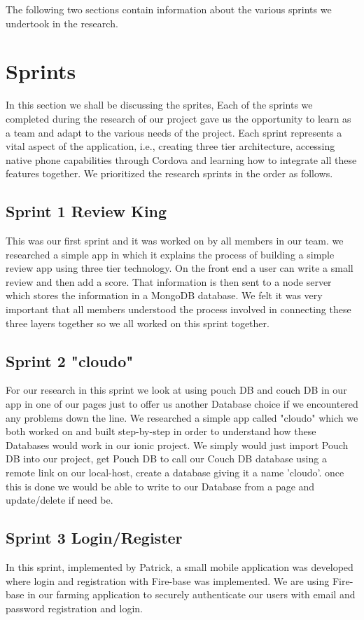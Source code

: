 \documentclass[12pt,a4paper,oneside,openany]{book}
\begin{document}
\noindent The following two sections contain information about the various sprints we undertook in the research. \\


\section{Sprints} \label{reseacrh_sprints}
In this section we shall be discussing the sprites, Each of the sprints we completed during the research of our project gave us the opportunity to learn as a team and adapt to the various needs of the project. Each sprint represents a vital aspect of the application, i.e., creating three tier architecture, accessing native phone capabilities through Cordova and learning how to integrate all these features together. We prioritized the research sprints in the order as follows.

\subsection{Sprint 1 Review King}
This was our first sprint and it was worked on by all members in our team. we researched a simple app in which it explains the process of building a simple review app using three tier technology. On the front end a user can write a small review and then add a score. That information is then sent to a node server which stores the information in a MongoDB database. We felt it was very important that all members understood the process involved in connecting these three layers together so we all worked on this sprint together.   

\subsection{Sprint 2 "cloudo"}
For our research in this sprint we look at using pouch DB and couch DB in our app in one of our pages just to offer us another Database choice if we encountered any problems down the line. We researched a simple app called "cloudo" which we both worked on and built step-by-step in order to understand how these Databases would work in our ionic project. We simply would just import Pouch DB into our project, get Pouch DB to call our Couch DB database using a remote link on our local-host, create a database giving it a name 'cloudo'. once this is done we would be able to write to our Database from a page and update/delete if need be.

\subsection{Sprint 3 Login/Register}
In this sprint, implemented by Patrick, a small mobile application was developed where login and registration with Fire-base was implemented. We are using Fire-base in our farming application to securely authenticate our users with email and password registration and login. 
\end{document}
